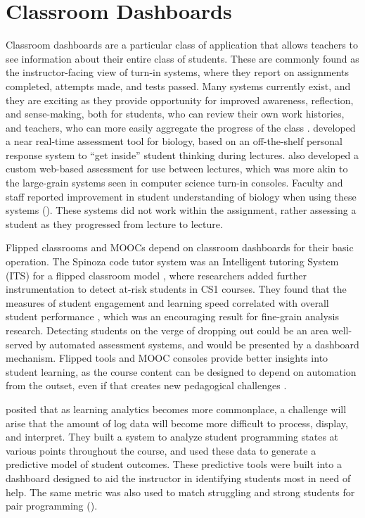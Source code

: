 \section{Classroom Dashboards}
\label{sec:teacher-dashboards}
Classroom dashboards are a particular class of application that allows teachers to see information about their entire class of students. These are commonly found as the instructor-facing view of turn-in systems, where they report on assignments completed, attempts made, and tests passed. Many systems currently exist, and they are exciting as they provide opportunity for improved awareness, reflection, and sense-making, both for students, who can review their own work histories, and teachers, who can more easily aggregate the progress of the class \citep{verbert2013learning}. \citet{Brewer:BioBytes} developed a near real-time assessment tool for biology, based on an off-the-shelf personal response system to ``get inside'' student thinking during lectures. \citeauthor{Brewer:BioBytes} also developed a custom web-based assessment for use between lectures, which was more akin to the large-grain systems seen in computer science turn-in consoles. Faculty and staff reported improvement in student understanding of biology when using these systems (\citeyear{Brewer:BioBytes}). These systems did not work within the assignment, rather assessing a student as they progressed from lecture to lecture.

Flipped classrooms and MOOCs depend on classroom dashboards for their basic operation. The Spinoza code tutor system was an Intelligent tutoring System (ITS) for a flipped classroom model \citep{Deeb15}, where researchers added further instrumentation to detect at-risk students in CS1 courses. They found that the measures of student engagement and learning speed correlated with overall student performance \citep{Tarimo:2016:EDA:2904446.2904471}, which was an encouraging result for fine-grain analysis research. Detecting students on the verge of dropping out could be an area well-served by automated assessment systems, and would be presented by a dashboard mechanism. Flipped tools and MOOC consoles provide better insights into student learning, as the course content can be designed to depend on automation from the outset, even if that creates new pedagogical challenges \citep{Martin:2012:MOO:2240236.2240246}.

\citet{Diana:2017:IDR:3027385.3027441} posited that as learning analytics becomes more commonplace, a challenge will arise that the amount of log data will become more difficult to process, display, and interpret. They built a system to analyze student programming states at various points throughout the course, and used these data to generate a predictive model of student outcomes. These predictive tools were built into a dashboard designed to aid the instructor in identifying students most in need of help. The same metric was also used to match struggling and strong students for pair programming (\citep{Diana:2017:IDR:3027385.3027441}).

